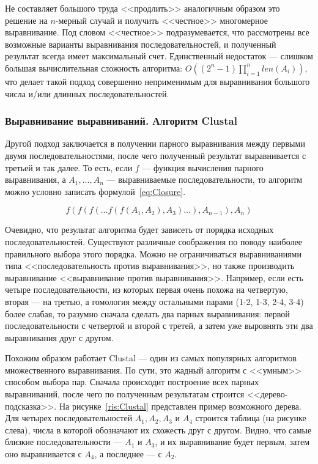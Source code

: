 \indent Не составляет большого труда <<продлить>> аналогичным образом это решение на $n$-мерный случай и получить <<честное>> многомерное выравнивание. Под словом <<честное>> подразумевается, что рассмотрены все возможные варианты выравнивания последовательностей, и полученный результат всегда имеет максимальный счет. Единственный недостаток --- слишком большая вычислительная сложность алгоритма: $O((2^n-1)\prod\limits_{i=1}^nlen(A_i))$, что делает такой подход совершенно неприменимым для выравнивания большого числа и/или длинных последовательностей. 

\subsubsection[Выравнивание выравниваний. Алгоритм Clustal]{\large Выравнивание выравниваний. Алгоритм Clustal}
\hspace{\parindent} Другой подход заключается в получении парного выравнивания между первыми двумя последовательностями, после чего полученный результат выравнивается с третьей и так далее. То есть, если $f$ --- функция вычисления парного выравнивания, а $A_1, \ldots ,A_n$ --- выравниваемые последовательности, то алгоритм можно условно записать формулой~\ref{eq:Closure}.

\begin{equation}\label{eq:Closure}
f(f(f(\ldots f(f(A_1, A_2), A_3) \ldots ), A_{n-1}), A_n)
\end{equation} 

\indent Очевидно, что результат алгоритма будет зависеть от порядка исходных последовательностей. Существуют различные соображения по поводу наиболее правильного выбора этого порядка. Можно не ограничиваться выравниваниями типа <<последовательность против выравнивания>>, но также производить выравнивание <<выравнивание против выравнивания>>. Например, если есть четыре последовательности, из которых первая очень похожа на четвертую, вторая --- на третью, а гомология между остальными парами (1-2, 1-3, 2-4, 3-4) более слабая, то разумно сначала сделать два парных выравнивания: первой последовательности с четвертой и второй с третей, а затем уже выровнять эти два выравнивания друг с другом.

\indent Похожим образом работает Clustal --- один из самых популярных алгоритмов множественного выравнивания. По сути, это жадный алгоритм с <<умным>> способом выбора пар. Сначала происходит построение всех парных выравниваний, после чего по полученным результатам строится <<дерево-подсказка>>. На рисунке~\ref{ris:Clustal} представлен пример возможного дерева. Для четырех последовательностей $A_1, A_2, A_3$ и $A_4$ строится таблица (на рисунке слева), числа в которой обозначают их схожесть друг с другом. Видно, что самые близкие последовательности --- $A_1$ и $A_3$, и их выравнивание будет первым, затем оно выравнивается с $A_4$, а последнее --- с $A_2$.

